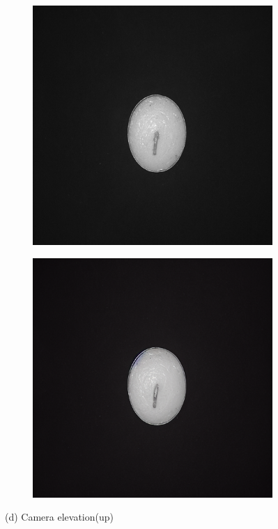\documentclass[12pt,DIV14,BCOR12mm,a4paper,footinclude=false,headinclude,parskip=half-,twoside,openright,cleardoublepage=empty,toc=index,bibliography=totoc,listof=totoc]{scrreprt}
\numberwithin{equation}{chapter}
\begin{document}
\begin{figure}
    \vspace{0.3cm} %

    \begin{subfigure}[t]{0.24\textwidth}
        \centering
        \includegraphics[width=\textwidth]{../media/diff_candles_up_real.png}
    \end{subfigure}%
    \hspace{0.02\textwidth}
    \begin{subfigure}[t]{0.24\textwidth}
        \centering
        \includegraphics[width=\textwidth]{../media/diff_candles_up_fake.png}
    \end{subfigure}
    \caption*{(d) Camera elevation(up)}


\end{figure}
\end{document}
